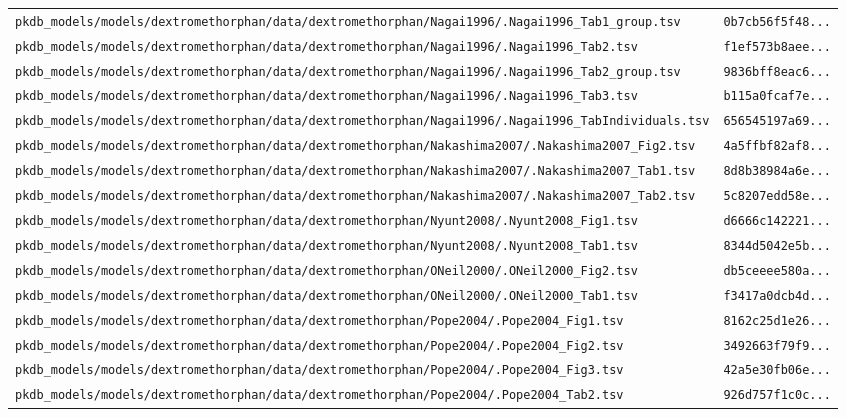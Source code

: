 \documentclass{article}
\begin{document}
\begin{longtable}{ll}
\texttt{pkdb\_models/models/dextromethorphan/data/dextromethorphan/Nagai1996/.Nagai1996\_Tab1\_group.tsv} & \texttt{0b7cb56f5f48...} \\
\texttt{pkdb\_models/models/dextromethorphan/data/dextromethorphan/Nagai1996/.Nagai1996\_Tab2.tsv} & \texttt{f1ef573b8aee...} \\
\texttt{pkdb\_models/models/dextromethorphan/data/dextromethorphan/Nagai1996/.Nagai1996\_Tab2\_group.tsv} & \texttt{9836bff8eac6...} \\
\texttt{pkdb\_models/models/dextromethorphan/data/dextromethorphan/Nagai1996/.Nagai1996\_Tab3.tsv} & \texttt{b115a0fcaf7e...} \\
\texttt{pkdb\_models/models/dextromethorphan/data/dextromethorphan/Nagai1996/.Nagai1996\_TabIndividuals.tsv} & \texttt{656545197a69...} \\
\texttt{pkdb\_models/models/dextromethorphan/data/dextromethorphan/Nakashima2007/.Nakashima2007\_Fig2.tsv} & \texttt{4a5ffbf82af8...} \\
\texttt{pkdb\_models/models/dextromethorphan/data/dextromethorphan/Nakashima2007/.Nakashima2007\_Tab1.tsv} & \texttt{8d8b38984a6e...} \\
\texttt{pkdb\_models/models/dextromethorphan/data/dextromethorphan/Nakashima2007/.Nakashima2007\_Tab2.tsv} & \texttt{5c8207edd58e...} \\
\texttt{pkdb\_models/models/dextromethorphan/data/dextromethorphan/Nyunt2008/.Nyunt2008\_Fig1.tsv} & \texttt{d6666c142221...} \\
\texttt{pkdb\_models/models/dextromethorphan/data/dextromethorphan/Nyunt2008/.Nyunt2008\_Tab1.tsv} & \texttt{8344d5042e5b...} \\
\texttt{pkdb\_models/models/dextromethorphan/data/dextromethorphan/ONeil2000/.ONeil2000\_Fig2.tsv} & \texttt{db5ceeee580a...} \\
\texttt{pkdb\_models/models/dextromethorphan/data/dextromethorphan/ONeil2000/.ONeil2000\_Tab1.tsv} & \texttt{f3417a0dcb4d...} \\
\texttt{pkdb\_models/models/dextromethorphan/data/dextromethorphan/Pope2004/.Pope2004\_Fig1.tsv} & \texttt{8162c25d1e26...} \\
\texttt{pkdb\_models/models/dextromethorphan/data/dextromethorphan/Pope2004/.Pope2004\_Fig2.tsv} & \texttt{3492663f79f9...} \\
\texttt{pkdb\_models/models/dextromethorphan/data/dextromethorphan/Pope2004/.Pope2004\_Fig3.tsv} & \texttt{42a5e30fb06e...} \\
\texttt{pkdb\_models/models/dextromethorphan/data/dextromethorphan/Pope2004/.Pope2004\_Tab2.tsv} & \texttt{926d757f1c0c...} \\

\end{longtable}
\end{document}

